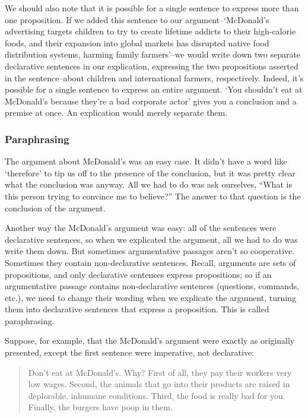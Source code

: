 We should also note that it is possible for a single sentence to express more than one proposition.
If we added this sentence to our argument--`McDonald's advertising targets children to try to
create lifetime addicts to their high-calorie foods, and their expansion into global markets has
disrupted native food distribution systems, harming family farmers'--we would write down two
separate declarative sentences in our explication, expressing the two propositions asserted in the
sentence--about children and international farmers, respectively. Indeed, it's possible for a single
sentence to express an entire argument. `You shouldn't eat at McDonald's because they're a bad
corporate actor' gives you a conclusion and a premise at once. An explication would merely
separate them.

\subsubsection{Paraphrasing}
The argument about McDonald's was an easy case. It didn't have a word like `therefore' to tip us
off to the presence of the conclusion, but it was pretty clear what the conclusion was anyway. All
we had to do was ask ourselves, ``What is this person trying to convince me to believe?'' The
answer to that question is the conclusion of the argument.

Another way the McDonald's argument was easy: all of the sentences were declarative sentences,
so when we explicated the argument, all we had to do was write them down. But sometimes
argumentative passages aren't so cooperative. Sometimes they contain non-declarative sentences.
Recall, arguments are sets of propositions, and only declarative sentences express propositions; so
if an argumentative passage contains non-declarative sentences (questions, commands, etc.), we
need to change their wording when we explicate the argument, turning them into declarative
sentences that express a proposition. This is called paraphrasing.

Suppose, for example, that the McDonald's argument were exactly as originally presented, except
the first sentence were imperative, not declarative:

\begin{quote}
Don't eat at McDonald's. Why? First of all, they pay their workers very low wages.
Second, the animals that go into their products are raised in deplorable, inhumane
conditions. Third, the food is really bad for you. Finally, the burgers have poop in them.
\end{quote}

